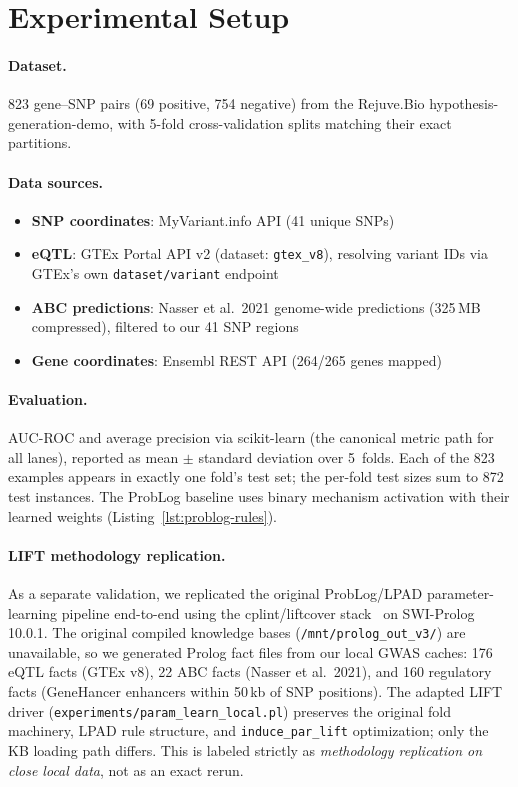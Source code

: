 \documentclass[]{article}
\newcommand{\code}[1]{\texttt{#1}}
\begin{document}
\section{Experimental Setup}
\label{sec:setup}

\paragraph{Dataset.}
823 gene--SNP pairs (69 positive, 754 negative) from the Rejuve.Bio
hypothesis-generation-demo, with 5-fold cross-validation splits matching
their exact partitions.

\paragraph{Data sources.}
\begin{itemize}
\item \textbf{SNP coordinates}: MyVariant.info API (41 unique SNPs)
\item \textbf{eQTL}: GTEx Portal API v2 (dataset: \code{gtex\_v8}),
  resolving variant IDs via GTEx's own \code{dataset/variant} endpoint
\item \textbf{ABC predictions}: Nasser et al.\ 2021 genome-wide
  predictions (325\,MB compressed), filtered to our 41 SNP regions
\item \textbf{Gene coordinates}: Ensembl REST API (264/265 genes mapped)
\end{itemize}

\paragraph{Evaluation.}
AUC-ROC and average precision via scikit-learn (the canonical metric path for
all lanes), reported as mean $\pm$ standard deviation over 5~folds.
Each of the 823 examples appears in exactly one fold's test set; the per-fold
test sizes sum to 872 test instances.
The ProbLog baseline uses binary mechanism activation with their learned
weights (Listing~\ref{lst:problog-rules}).

\paragraph{LIFT methodology replication.}
As a separate validation, we replicated the original ProbLog/LPAD parameter-learning
pipeline end-to-end using the cplint/liftcover stack~\cite{Riguzzi2018} on SWI-Prolog
10.0.1.  The original compiled knowledge bases
(\code{/mnt/prolog\_out\_v3/}) are unavailable, so we generated Prolog fact files
from our local GWAS caches: 176 eQTL facts (GTEx v8), 22 ABC facts (Nasser et
al.\ 2021), and 160 regulatory facts (GeneHancer enhancers within 50\,kb of SNP
positions).  The adapted LIFT driver (\code{experiments/param\_learn\_local.pl})
preserves the original fold machinery, LPAD rule structure, and \code{induce\_par\_lift}
optimization; only the KB loading path differs.  This is labeled strictly as
\emph{methodology replication on close local data}, not as an exact rerun.
\end{document}
